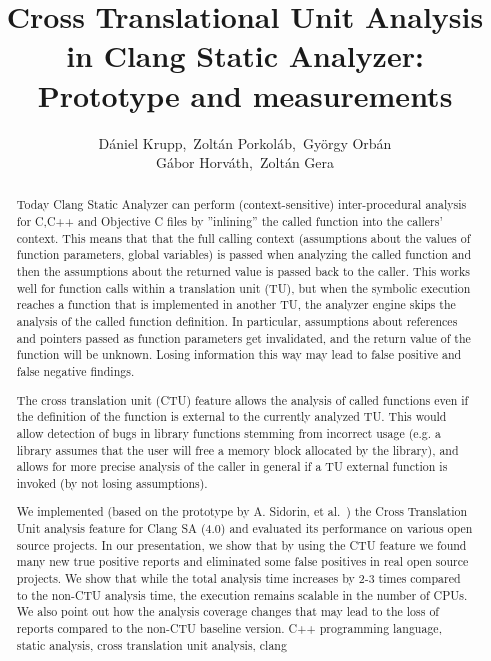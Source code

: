 \documentclass{article}
\title{Cross Translational Unit Analysis in Clang Static Analyzer: Prototype and measurements}
\author{D\'aniel Krupp\inst1,\ Zolt\'an Porkol\'ab\inst1,\ Gy\"orgy Orb\'an\inst1\\
        G\'abor Horv\'ath\inst2,\ Zolt\'an Gera\inst2}
\institute{\inst1Ericsson Ltd., \inst2E\"{o}tv\"{o}s Lor\'{a}nd University, Faculty of Informatics\\
             \inst1\url{daniel.krupp@ericsson.com}, 
             \inst1\url{zoltan.porkolab@ericsson.com},
             \inst1\url{gyorgy.orban@ericsson.com},
             \inst2\url{xazax@caesar.elte.hu}, 
             \inst2\url{gerazo@caesar.elte.hu}}
\begin{document}
\maketitle


\begin{abstract}
Today Clang Static Analyzer \cite{clangsa} can perform (context-sensitive) inter-procedural analysis for 
C,C++ and Objective C files by ''inlining'' 
the called function into the callers' context. This means that that the full 
calling context
(assumptions about the values of function parameters, global variables) is passed when 
analyzing the called function and
then the assumptions about the returned value is passed back to the caller. 
This works well for function calls within a
translation unit (TU), but when the symbolic execution reaches a function that 
is implemented in another TU, the analyzer engine 
skips the analysis of the called function definition. In particular,
assumptions about references and pointers passed as function 
parameters get invalidated, and the return value of the function will be unknown.
Losing information this way may lead to false positive
and false negative findings.

The cross translation unit (CTU) feature allows the analysis of called 
functions even if the definition of the function is external to the currently 
analyzed TU. This would allow detection of bugs in library functions stemming
from incorrect usage (e.g. a library assumes that the user will free a memory 
block allocated by the library), and allows for more precise analysis
of the caller in general if a TU external function is invoked
(by not losing assumptions).

We implemented (based on the prototype by A. Sidorin, et al.~\cite{artemctu})
the Cross Translation Unit analysis feature for Clang SA (4.0) and evaluated 
its performance on various open source projects. In our presentation, we show 
that by using the CTU feature we found many new true positive reports and 
eliminated some false positives in real open source projects. We show that 
while the total analysis time increases by 2-3 times compared to 
the non-CTU analysis time, the execution remains scalable in the number of CPUs. 
We also point out how the analysis
coverage changes that may lead to the loss of reports compared to the 
non-CTU baseline version.
\keywords C++ programming language, static analysis, cross translation unit analysis, clang
\end{abstract}
\end{document}
